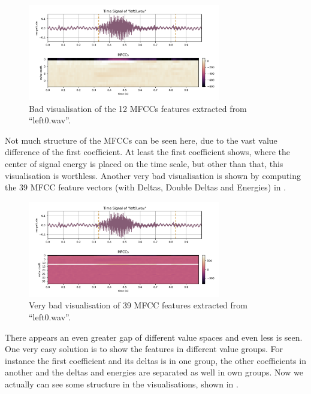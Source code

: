 \begin{figure}[!ht]
  \centering
    \includegraphics[width=0.75\textwidth]{./3_theory/figs/a3_mfcc/left0_mfcc_only.png}
  \caption{Bad visualisation of the 12 MFCCs features extracted from \enquote{left0.wav}.}
  \label{fig:left0_mfcc_only}
\end{figure}
\FloatBarrier
\noindent
Not much structure of the MFCCs can be seen here, due to the vast value difference of the first coefficient. At least the first coefficient shows, where the center of signal energy is placed on the time scale, but other than that, this visualisation is worthless.
Another very bad visualisation is shown by computing the 39 MFCC feature vectors (with Deltas, Double Deltas and Energies) in .

\begin{figure}[!ht]
  \centering
    \includegraphics[width=0.75\textwidth]{./3_theory/figs/a3_mfcc/left0_no_order_norm0.png}
  \caption{Very bad visualisation of 39 MFCC features extracted from \enquote{left0.wav}.}
  \label{fig:left0_no_order}
\end{figure}
\FloatBarrier
\noindent
There appears an even greater gap of different value spaces and even less is seen.
One very easy solution is to show the features in different value groups. For instance the first coefficient and its deltas is in one group, the other coefficients in another and the deltas and energies are separated as well in own groups. Now we actually can see some structure in the visualisations, shown in .

